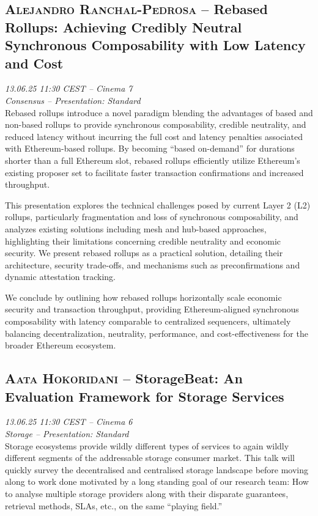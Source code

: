 \clearpage
\subsection {\textsc{Alejandro Ranchal-Pedrosa}  -- Rebased Rollups: Achieving Credibly Neutral Synchronous Composability with Low Latency and Cost} \noindent \textit {13.06.25 11:30 CEST -- Cinema 7\\ Consensus -- Presentation: Standard}\\[1em] Rebased rollups introduce a novel paradigm blending the advantages of based and non-based rollups to provide synchronous composability, credible neutrality, and reduced latency without incurring the full cost and latency penalties associated with Ethereum-based rollups. By becoming ``based on-demand'' for durations shorter than a full Ethereum slot, rebased rollups efficiently utilize Ethereum’s existing proposer set to facilitate faster transaction confirmations and increased throughput.

This presentation explores the technical challenges posed by current Layer 2 (L2) rollups, particularly fragmentation and loss of synchronous composability, and analyzes existing solutions including mesh and hub-based approaches, highlighting their limitations concerning credible neutrality and economic security. We present rebased rollups as a practical solution, detailing their architecture, security trade-offs, and mechanisms such as preconfirmations and dynamic attestation tracking.

We conclude by outlining how rebased rollups horizontally scale economic security and transaction throughput, providing Ethereum-aligned synchronous composability with latency comparable to centralized sequencers, ultimately balancing decentralization, neutrality, performance, and cost-effectiveness for the broader Ethereum ecosystem.

\clearpage
\subsection {\textsc{Aata Hokoridani}  -- StorageBeat: An Evaluation Framework for Storage Services} \noindent \textit {13.06.25 11:30 CEST -- Cinema 6\\ Storage -- Presentation: Standard}\\[1em] Storage ecosystems provide wildly different types of services to again wildly different segments of the addressable storage consumer market. This talk will quickly survey the decentralised and centralised storage landscape before moving along to work done motivated by a long standing goal of our research team: How to analyse multiple storage providers along with their disparate guarantees, retrieval methods, SLAs, etc., on the same ``playing field.''


